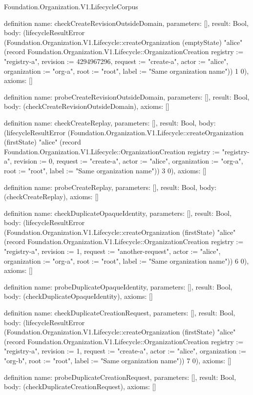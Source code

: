 \begin{lexlean}{Foundation.Organization.V1.LifecycleCorpus}
\begin{semanticmodule}
definition{
  name: checkCreateRevisionOutsideDomain,
  parameters: [],
  result: Bool,
  body: (lifecycleResultError (Foundation.Organization.V1.Lifecycle::createOrganization (emptyState) "alice" (record Foundation.Organization.V1.Lifecycle::OrganizationCreation {registry := "registry-a", revision := 4294967296, request := "create-a", actor := "alice", organization := "org-a", root := "root", label := "Same organization name"})) 1 0),
  axioms: []
}

definition{
  name: probeCreateRevisionOutsideDomain,
  parameters: [],
  result: Bool,
  body: (checkCreateRevisionOutsideDomain),
  axioms: []
}

definition{
  name: checkCreateReplay,
  parameters: [],
  result: Bool,
  body: (lifecycleResultError (Foundation.Organization.V1.Lifecycle::createOrganization (firstState) "alice" (record Foundation.Organization.V1.Lifecycle::OrganizationCreation {registry := "registry-a", revision := 0, request := "create-a", actor := "alice", organization := "org-a", root := "root", label := "Same organization name"})) 3 0),
  axioms: []
}

definition{
  name: probeCreateReplay,
  parameters: [],
  result: Bool,
  body: (checkCreateReplay),
  axioms: []
}

definition{
  name: checkDuplicateOpaqueIdentity,
  parameters: [],
  result: Bool,
  body: (lifecycleResultError (Foundation.Organization.V1.Lifecycle::createOrganization (firstState) "alice" (record Foundation.Organization.V1.Lifecycle::OrganizationCreation {registry := "registry-a", revision := 1, request := "another-request", actor := "alice", organization := "org-a", root := "root", label := "Same organization name"})) 6 0),
  axioms: []
}

definition{
  name: probeDuplicateOpaqueIdentity,
  parameters: [],
  result: Bool,
  body: (checkDuplicateOpaqueIdentity),
  axioms: []
}

definition{
  name: checkDuplicateCreationRequest,
  parameters: [],
  result: Bool,
  body: (lifecycleResultError (Foundation.Organization.V1.Lifecycle::createOrganization (firstState) "alice" (record Foundation.Organization.V1.Lifecycle::OrganizationCreation {registry := "registry-a", revision := 1, request := "create-a", actor := "alice", organization := "org-b", root := "root", label := "Same organization name"})) 7 0),
  axioms: []
}

definition{
  name: probeDuplicateCreationRequest,
  parameters: [],
  result: Bool,
  body: (checkDuplicateCreationRequest),
  axioms: []
}


\end{semanticmodule}
\end{lexlean}

